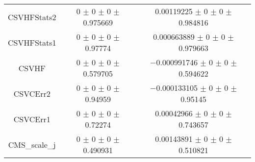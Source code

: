 \begin{table}
\begin{tabular}{ccc}
CSVHFStats2 	& \num{0} $\pm$ \num{0} $\pm$ \num{0} $\pm$ \num{0.975669} 	& \num{0.00119225} $\pm$ \num{0} $\pm$ \num{0} $\pm$ \num{0.984816}\\
CSVHFStats1 	& \num{0} $\pm$ \num{0} $\pm$ \num{0} $\pm$ \num{0.97774} 	& \num{0.000663889} $\pm$ \num{0} $\pm$ \num{0} $\pm$ \num{0.979663}\\
CSVHF 	& \num{0} $\pm$ \num{0} $\pm$ \num{0} $\pm$ \num{0.579705} 	& \num{-0.000991746} $\pm$ \num{0} $\pm$ \num{0} $\pm$ \num{0.594622}\\
CSVCErr2 	& \num{0} $\pm$ \num{0} $\pm$ \num{0} $\pm$ \num{0.94959} 	& \num{-0.000133105} $\pm$ \num{0} $\pm$ \num{0} $\pm$ \num{0.95145}\\
CSVCErr1 	& \num{0} $\pm$ \num{0} $\pm$ \num{0} $\pm$ \num{0.72274} 	& \num{0.00042966} $\pm$ \num{0} $\pm$ \num{0} $\pm$ \num{0.743657}\\
CMS\_scale\_j 	& \num{0} $\pm$ \num{0} $\pm$ \num{0} $\pm$ \num{0.490931} 	& \num{0.00143891} $\pm$ \num{0} $\pm$ \num{0} $\pm$ \num{0.510821}\\
\bottomrule
\end{tabular}
\end{table}